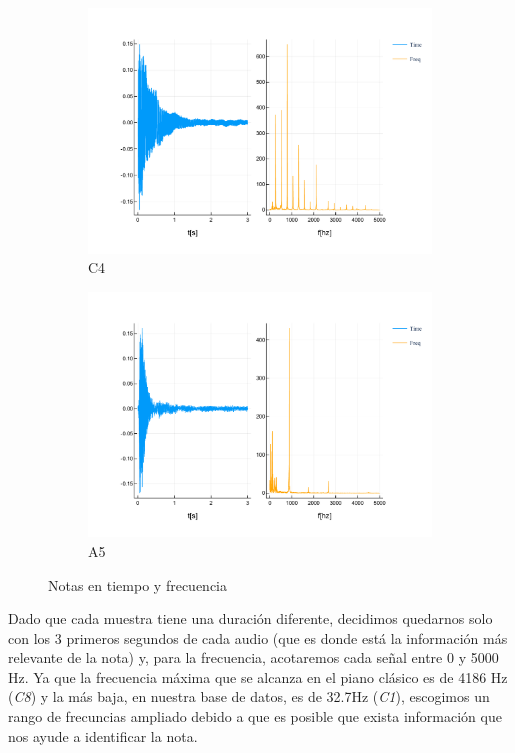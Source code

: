 \documentclass[12pt]{article}
\begin{document}
\begin{figure}[!ht]
	\centering
	\begin{subfigure}{.5\textwidth}
		\centering
		\includegraphics[width=1.0\linewidth]{assets/C4.pdf}
		\caption{C4}
		\label{fig:c4}
	\end{subfigure}%
	\begin{subfigure}{.5\textwidth}
		\centering
		\includegraphics[width=1.0\linewidth]{assets/A5.pdf}
		\caption{A5}
		\label{fig:a5}
	\end{subfigure}
	\caption{Notas en tiempo y frecuencia}
\end{figure}

\bigskip
Dado que cada muestra tiene una duración diferente, decidimos quedarnos solo con los 3 primeros segundos de cada audio (que es donde está la información más
relevante de la nota) y, para la frecuencia, acotaremos cada señal entre 0 y 5000 Hz. Ya que la frecuencia máxima que se alcanza en el 
piano clásico es de 4186 Hz (\textit{C8}) y la más baja, en nuestra base de datos, es de 32.7Hz (\textit{C1}), escogimos un rango
de frecuncias ampliado debido a que es posible que exista información que nos ayude a identificar la nota.
\end{document}

